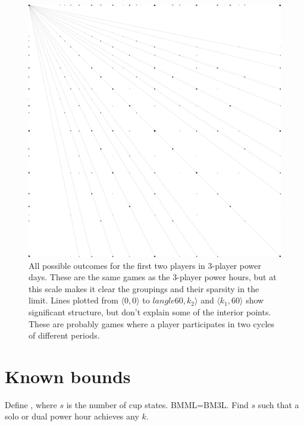 \documentclass[twocolumn]{article}
\begin{document}
\begin{figure}
\begin{center}
\includegraphics[width=0.90 \linewidth]{powerday3.pdf}
\end{center}\vspace{-0.1in}
\caption{All possible outcomes for the first two players in 3-player
  power days. These are the same games as the 3-player power hours,
  but at this scale makes it clear the groupings and their sparsity in
  the limit. Lines plotted from $\langle 0,0 \rangle$ to $langle 60,
  k_2 \rangle$ and $\langle k_1, 60 \rangle$ show significant
  structure, but don't explain some of the interior points. These are
  probably games where a player participates in two cycles of
  different periods.
}
\label{fig:powerday3}
\end{figure}

\section{Known bounds}

Define \bmsl, where $s$ is the number of cup states. BMML=BM3L. Find
$s$ such that a solo or dual power hour achieves any $k$.
\end{document}
